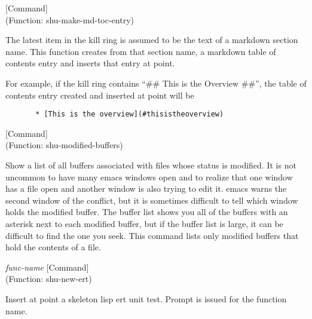 \vspace{1em}
\noindent
{}
\usebox{\funcname}
 \hfill [Command]\\%
 (Function: shu-make-md-toc-entry)

\begin{doc-string}
The latest item in the kill ring is assumed to be the text of a markdown
section name.  This function creates from that section name, a markdown table of
contents entry and inserts that entry at point.

For example, if the kill ring contains ``\#\# This is the Overview \#\#'', the table
of contents entry created and inserted at point will be

\small{\begin{verbatim}
       * [This is the overview](#thisistheoverview)
\end{verbatim}}
\end{doc-string}

\vspace{1em}
\noindent
{}
\usebox{\funcname}
 \hfill [Command]\\%
 (Function: shu-modified-buffers)

\begin{doc-string}
Show a list of all buffers associated with files whose status is modified.
It is not uncommon to have many emacs windows open and to realize that one
window has a file open and another window is also trying to edit it.  emacs
warns the second window of the conflict, but it is sometimes difficult to tell
which window holds the modified buffer.  The buffer list shows you all of the
buffers with an asterisk next to each modified buffer, but if the buffer list
is large, it can be difficult to find the one you seek.  This command lists
only modified buffers that hold the contents of a file.
\end{doc-string}

\vspace{1em}
\noindent
{}
\usebox{\funcname}\emph{func-name}
 \hfill [Command]\\%
 (Function: shu-new-ert)

\begin{doc-string}
Insert at point a skeleton lisp ert unit test.  Prompt is issued for the
function name.
\end{doc-string}

